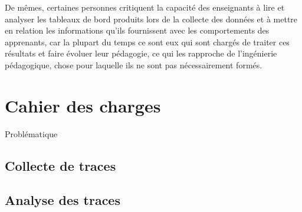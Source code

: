             De mêmes, certaines personnes critiquent la capacité des enseignants à lire et analyser les tableaux de bord produits lors de la collecte des données et à mettre en relation les informations qu’ils fournissent avec les comportements des apprenants, car la plupart du temps ce sont eux qui sont chargés de traiter ces résultats et faire évoluer leur pédagogie, ce qui les rapproche de l’ingénierie pédagogique, chose pour laquelle ils ne sont pas nécessairement formés.
        
       


    \section{Cahier des charges  }

        Problématique

        \subsection{Collecte de traces}


        \subsection{Analyse des traces}